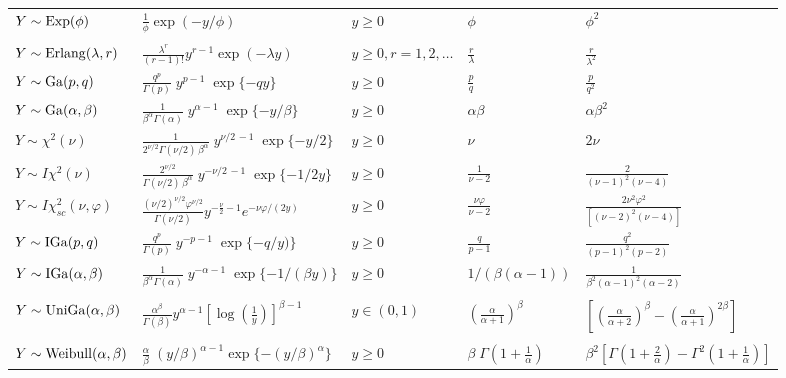 \documentclass[9pt,a4paper]{extarticle}
\begin{document}
\begin{tabular}{lllll}
$Y \sim {\rm Exp}(\phi)$ & $ \frac{1}{\phi}\exp(-y/\phi)$ & $y \geq 0$ & $\phi$ & $\phi^2$ \\
\\
$Y \sim {\rm Erlang}(\lambda, r)$ & $ \frac{\lambda^r}{(r-1)!} y^{r-1} \exp(-\lambda y)$ & $y \geq 0,  r = 1, 2, \ldots$ & 
$ \frac{r}{\lambda}$ & $\frac{r}{\lambda^2}$ \\
$Y \sim {\rm Ga}(p, q)$ & $\frac{q^p}{\Gamma(p)} \; y^{p-1} \; \exp\{-q y\}$ & $y \geq 0$  & $\frac{p}{q}$ & $\frac{p}{q^2}$  \\
$Y \sim {\rm Ga}(\alpha, \beta)$ & $\frac{1}{\beta^\alpha\Gamma(\alpha)} \; y^{\alpha-1} \; \exp\{-y/\beta\}$ & $y \geq 0$  & $\alpha\beta$ & $\alpha\beta^2$  \\
$Y \sim \chi^2(\nu)$ & $\frac{1}{2^{\nu/2}\Gamma(\nu/2) \, \beta^\alpha} \; y^{\nu/2 \,-1} \; \exp\{-y/2\}$ & $y \geq 0$  & $\nu$ & $2\nu$  \\
$Y \sim I\chi^2(\nu)$ & $\frac{2^{\nu/2}}{\Gamma(\nu/2) \, \beta^\alpha} \; y^{-\nu/2 \,-1} \; \exp\{-1/2y\}$ & $y \geq 0$  & $\frac{1}{\nu-2}$ & $\frac{2}{(\nu-1)^2(\nu-4)}$  \\
$Y \sim I\chi_{sc}^2(\nu,\varphi)$ & $\frac{(\nu/2)^{\nu/2}\varphi^{\nu/2}}{\Gamma(\nu/2)} y^{-\frac{\nu}{2}-1} e^{-\nu \varphi/(2y)}$ & $y \geq 0$  & $\frac{\nu \varphi}{\nu - 2}$ & $\frac{2\nu^2 \varphi^2}{[(\nu - 2)^2 (\nu - 4)]}$  \\
$Y \sim {\rm IGa}(p, q)$ & $\frac{q^p}{\Gamma(p)} \; y^{-p-1} \; \exp\{-q/y)\}$ & $y \geq 0$  & $\frac{q}{p-1}$  & $\frac{q^2}{(p-1)^2(p-2)}$  \\
	$Y \sim {\rm IGa}(\alpha, \beta)$ & $\frac{1}{\beta^\alpha\Gamma(\alpha)} \; y^{-\alpha-1} \; \exp\{-1/(\beta y)\}$ & $y \geq 0$  & $1/(\beta(\alpha-1))$  & $\frac{1}{\beta^2(\alpha-1)^2(\alpha-2)}$  \\
\\
$Y \sim {\rm UniGa}(\alpha, \beta)$ & $\frac{\alpha^{\beta}}{\Gamma(\beta)} y^{\alpha - 1} \left[\log\left(\frac{1}{y}\right) \right]^{\beta - 1}$  &  $y \in (0,1) $  & $\left(\frac{\alpha}{\alpha + 1}\right)^\beta$ &  $\left[\left(\frac{\alpha}{\alpha + 2}\right)^\beta - \left(\frac{\alpha}{\alpha + 1}\right)^{2\beta} \right]$ \\
\\
$Y \sim {\rm Weibull}(\alpha, \beta)$ & $\frac{\alpha}{\beta} \; (y/\beta)^{\alpha-1} \exp\{-(y/\beta)^{\alpha}\}$  &  $y \geq 0$  & $\beta \; \Gamma(1+\frac{1}{\alpha})$ &  $\beta^{2} \left[\Gamma(1+\frac{2}{\alpha}) - \Gamma^2(1+\frac{1}{\alpha}) \right]$ \\

\end{tabular}
\end{document}
